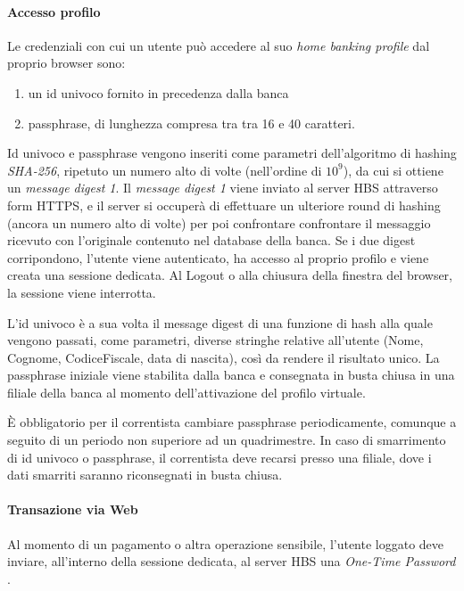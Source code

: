 \paragraph{Accesso profilo}

Le credenziali con cui un utente può accedere al suo \emph{home banking profile} dal proprio browser sono:
\begin{enumerate}
\item un id univoco fornito in precedenza dalla banca
\item passphrase, di lunghezza compresa tra tra 16 e 40 caratteri.
\end{enumerate}
Id univoco e passphrase vengono inseriti come parametri dell'algoritmo di hashing \emph{SHA-256}, ripetuto un numero alto di volte (nell'ordine di $10^9$), da cui si ottiene un \emph{message digest 1}. Il \emph{message digest 1} viene inviato al server HBS attraverso form HTTPS, e il server si occuperà di effettuare un ulteriore round di hashing (ancora un numero alto di volte) per poi confrontare confrontare il messaggio ricevuto con l'originale contenuto nel database della banca. Se i due digest corripondono, l'utente viene autenticato, ha accesso al proprio profilo e viene creata una sessione dedicata. Al Logout o alla chiusura della finestra del browser, la sessione viene interrotta.

L'id univoco è a sua volta il message digest di una funzione di hash alla quale vengono passati, come parametri, diverse stringhe relative all'utente (Nome, Cognome, CodiceFiscale, data di nascita), così da rendere il risultato unico.
La passphrase iniziale viene stabilita dalla banca e consegnata in busta chiusa in una filiale della banca al momento dell'attivazione del profilo virtuale.

\`E obbligatorio per il correntista cambiare passphrase periodicamente, comunque a seguito di un periodo non superiore ad un quadrimestre.
In caso di smarrimento di id univoco o passphrase, il correntista deve recarsi presso una filiale, dove i dati smarriti saranno riconsegnati in busta chiusa.


\paragraph{Transazione via Web}

Al momento di un pagamento o altra operazione sensibile, l'utente loggato deve inviare, all'interno della sessione dedicata, al server HBS una \emph{One-Time Password} \cite{totprfc}.

